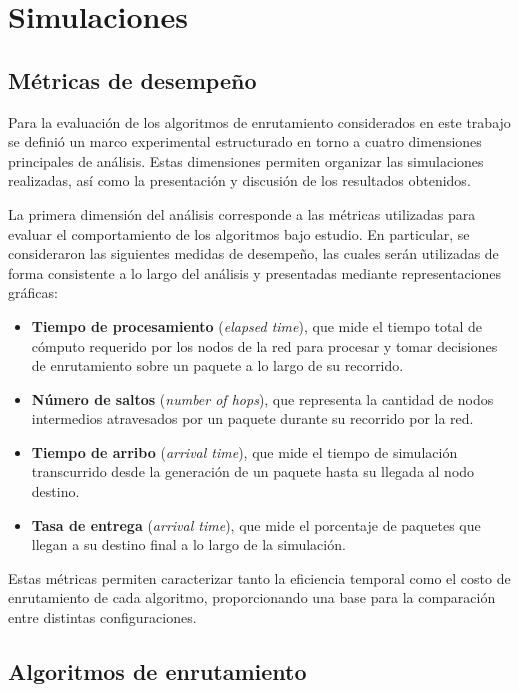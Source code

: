 \chapter{Simulaciones}

\section{Métricas de desempeño}

Para la evaluación de los algoritmos de enrutamiento considerados en este trabajo se definió un marco experimental estructurado en torno a cuatro dimensiones principales de análisis. Estas dimensiones permiten organizar las simulaciones realizadas, así como la presentación y discusión de los resultados obtenidos.

La primera dimensión del análisis corresponde a las métricas utilizadas para evaluar el comportamiento de los algoritmos bajo estudio. En particular, se consideraron las siguientes medidas de desempeño, las cuales serán utilizadas de forma consistente a lo largo del análisis y presentadas mediante representaciones gráficas:

\begin{itemize}
    \item \textbf{Tiempo de procesamiento} (\textit{elapsed time}), que mide el tiempo total de cómputo requerido por los nodos de la red para procesar y tomar decisiones de enrutamiento sobre un paquete a lo largo de su recorrido.
    \item \textbf{Número de saltos} (\textit{number of hops}), que representa la cantidad de nodos intermedios atravesados por un paquete durante su recorrido por la red.
    \item \textbf{Tiempo de arribo} (\textit{arrival time}), que mide el tiempo de simulación transcurrido desde la generación de un paquete hasta su llegada al nodo destino.
    \item \textbf{Tasa de entrega} (\textit{arrival time}), que mide el porcentaje de paquetes que llegan a su destino final a lo largo de la simulación.
\end{itemize}

Estas métricas permiten caracterizar tanto la eficiencia temporal como el costo de enrutamiento de cada algoritmo, proporcionando una base para la comparación entre distintas configuraciones.

\section{Algoritmos de enrutamiento}

